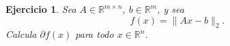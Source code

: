 \documentclass[11pt]{report}
\newtheorem{ex}{Ejercicio}
\begin{document}


\begin{ex}
Sea \( A \in \mathbb{R}^{m \times n} \), \( b \in \mathbb{R}^m \), y sea
\[
f(x) = \| A x - b \|_2.
\]
Calcula \( \partial f(x) \) para todo \( x \in \mathbb{R}^n \).
\end{ex}




\end{document}
